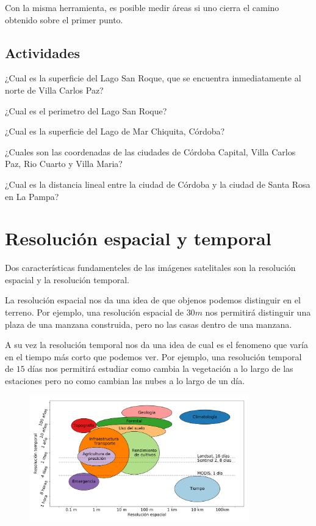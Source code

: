 \documentclass[a4paper,12pt]{book}
\begin{document}
Con la misma herramienta, es posible medir áreas si uno cierra el camino obtenido sobre el primer punto.

\section{Actividades}

\begin{que}
    ¿Cual es la superficie del Lago San Roque, que se encuentra inmediatamente al norte de Villa Carlos Paz?
\end{que}
\begin{que}
    ¿Cual es el perimetro del Lago San Roque?
\end{que}
\begin{que}
    ¿Cual es la superficie del Lago de Mar Chiquita, Córdoba?
\end{que}

\begin{que}
    ¿Cuales son las coordenadas de las ciudades de Córdoba Capital, Villa Carlos Paz, Rio Cuarto y Villa Maria?
\end{que}

\begin{que}
    ¿Cual es la distancia lineal entre la ciudad de Córdoba y la ciudad de Santa Rosa en La Pampa?
\end{que}

\chapter{Resolución espacial y temporal}
Dos características fundamenteles de las imágenes satelitales son la resolución espacial y la resolución temporal.

La resolución espacial nos da una idea de que objenos podemos distinguir en el terreno. Por ejemplo, una resolución espacial de $30m$ nos permitirá distinguir una plaza de una manzana construida, pero no las casas dentro de una manzana.

A su vez la resolución temporal nos da una idea de cual es el fenomeno que varía en el tiempo más corto que podemos ver. Por ejemplo, una resolución temporal de $15$ días nos permitirá estudiar como cambia la vegetación a lo largo de las estaciones pero no como cambian las nubes a lo largo de un día.

\begin{figure}[h!]
    \centering
    \includegraphics[width=0.85\textwidth]{fig:evst.png}
    \caption{}
    \label{fig:evst}
\end{figure}
\end{document}
